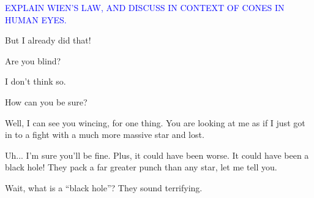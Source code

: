 \documentclass[main.tex]{subfiles}
\begin{document}
\begin{tcolorbox}[sharp corners, colback=blue!30, colframe=blue!80!blue, title=Why is a star observed to have a given color?]
\par \textcolor{blue} {EXPLAIN WIEN'S LAW, AND DISCUSS IN CONTEXT OF CONES IN HUMAN EYES.}
\end{tcolorbox}


\par \Maia But I already did that!

\par \Pleione Are you blind?

\par \Maia I don't think so.

\par \Pleione How can you be sure?

\par \Maia Well, I can see you wincing, for one thing.  You are looking at me as if I just got in to a fight with a much more massive star and lost.

\par \Pleione Uh... I'm sure you'll be fine. Plus, it could have been worse.  It could have been a black hole!  They pack a far greater punch than any star, let me tell you.

\par \Maia Wait, what is a ``black hole''?  They sound terrifying.
\end{document}
